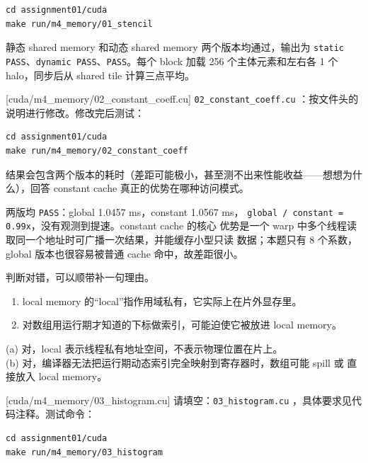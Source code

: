 \documentclass[11pt,a4paper,fontset=fandol]{ctexart}
\begin{document}
\begin{lstlisting}
cd assignment01/cuda
make run/m4_memory/01_stencil
\end{lstlisting}

\begin{answer}
静态 shared memory 和动态 shared memory 两个版本均通过，输出为
\texttt{static PASS}、\texttt{dynamic PASS}、\texttt{PASS}。每个 block
加载 256 个主体元素和左右各 1 个 halo，同步后从 shared tile 计算三点平均。
\end{answer}

[cuda/m4\_memory/02\_constant\_coeff.cu]
\texttt{02\_constant\_coeff.cu} ：按文件头的说明进行修改。修改完后测试：

\begin{lstlisting}
cd assignment01/cuda
make run/m4_memory/02_constant_coeff
\end{lstlisting}

结果会包含两个版本的耗时（差距可能极小，甚至测不出来性能收益——想想为什么），回答 constant cache 真正的优势在哪种访问模式。

\begin{answer}
两版均 \texttt{PASS}：global 1.0457 ms，constant 1.0567 ms，
\texttt{global / constant = 0.99x}，没有观测到提速。constant cache 的核心
优势是一个 warp 中多个线程读取同一个地址时可广播一次结果，并能缓存小型只读
数据；本题只有 8 个系数，global 版本也很容易被普通 cache 命中，故差距很小。
\end{answer}

判断对错，可以顺带补一句理由。
\begin{enumerate}[label=(\alph*)]
  \item local memory 的“local”指作用域私有，它实际上在片外显存里。
  \item 对数组用运行期才知道的下标做索引，可能迫使它被放进 local memory。
\end{enumerate}

\begin{answer}
(a) 对，local 表示线程私有地址空间，不表示物理位置在片上。\\
(b) 对，编译器无法把运行期动态索引完全映射到寄存器时，数组可能 spill 或
直接放入 local memory。
\end{answer}

[cuda/m4\_memory/03\_histogram.cu]
请填空：\texttt{03\_histogram.cu} ，具体要求见代码注释。测试命令：

\begin{lstlisting}
cd assignment01/cuda
make run/m4_memory/03_histogram
\end{lstlisting}
\end{document}
